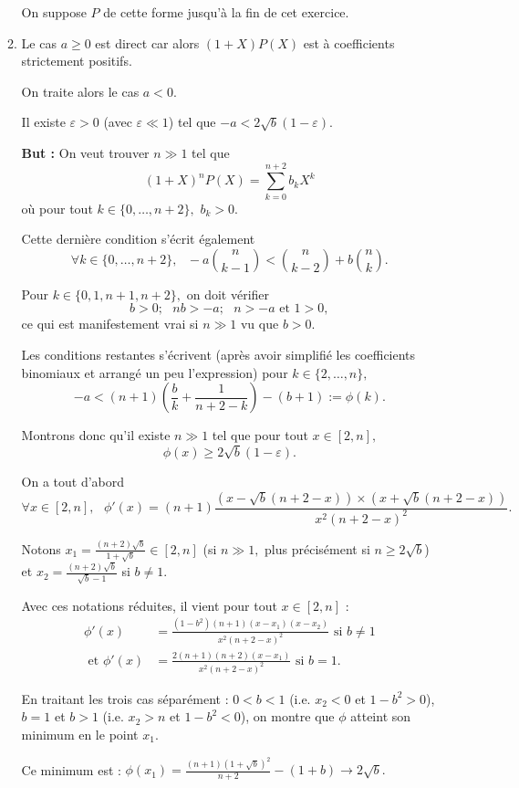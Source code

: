 \begin{enumerate}
\begin{enumerate}
On suppose $P$ de cette forme jusqu'à la fin de cet exercice.

\item Le cas $a\geq 0$ est direct car alors $(1+X)P(X)$ est à coefficients strictement positifs.

On traite alors le cas $a<0.$

Il existe $\varepsilon>0$ (avec $\varepsilon\ll 1$) tel que $-a<2\sqrt{b}(1-\varepsilon).$

\textbf{But :} On veut trouver $n\gg 1$ tel que $$(1+X)^{n}P(X)=\sum_{k=0}^{n+2}b_{k}X^{k}$$ où pour tout  $k\in\{0,\ldots,n+2\},$ $b_{k}>0.$

Cette dernière condition s'écrit également $$ \forall k\in \{0,\ldots,n+2\},\mbox{  } -a\binom{n}{k-1}<\binom{n}{k-2}+b\binom{n}{k}.$$

Pour $k\in\{0,1,n+1,n+2\},$ on doit vérifier $$b>0;\mbox{ }nb>-a;\mbox{ }n>-a \mbox{ et } 1>0,$$ ce qui est manifestement vrai si $n\gg 1$ vu que $b>0.$

Les conditions restantes s'écrivent (après avoir simplifié les coefficients binomiaux et arrangé un peu l'expression) pour $k\in\{2,\ldots,n\},$ $$ -a<(n+1)\left( \frac{b}{k}+\frac{1}{n+2-k}\right)-(b+1):=\phi(k).$$

Montrons donc qu'il existe $n\gg1$ tel que pour tout $x\in[2,n],$ $$\phi(x)\geq 2\sqrt{b}(1-\varepsilon).$$

On a  tout d'abord $$\forall x\in[2,n],\mbox{ } \phi'(x)=(n+1)\frac{\left( x-\sqrt{b}(n+2-x)\right)\times \left( x+\sqrt{b}(n+2-x)\right) } {x^{2}(n+2-x)^{2}}.$$

 Notons $\displaystyle x_{1}=\frac{(n+2)\sqrt{b}}{1+\sqrt{b}}\in[2,n]$ (si $n\gg1,$ plus précisément si $n\geq 2\sqrt{b}$) et  $\displaystyle x_{2}=\frac{(n+2)\sqrt{b}}{\sqrt{b}-1}$ si $b\neq 1.$

Avec ces notations réduites, il vient pour tout $x\in[2,n]$ : \begin{align*}
\phi'(x) & =\frac{(1-b^{2})(n+1)(x-x_{1})(x-x_{2})}{x^{2}(n+2-x)^{2}} \mbox{ si } b\neq 1\\
\mbox{ et } \phi'(x) & =\frac{2(n+1)(n+2)(x-x_{1})}{x^{2}(n+2-x)^{2}} \mbox{ si } b=1.    
\end{align*}

En traitant les trois cas séparément : $\boxed{0<b<1}$ (i.e. $x_{2}<0$ et $1-b^{2}>0$), $\boxed{ b=1} $ et $\boxed{b> 1}$ (i.e. $x_{2}>n$ et $1-b^{2}<0$), on montre que $\phi$ atteint son minimum en le point $x_{1}.$ 

Ce minimum est : $\displaystyle \phi(x_{1})=\frac{(n+1)(1+\sqrt{b})^{2}}{n+2}-(1+b)\longrightarrow 2\sqrt{b}.$


\end{enumerate}
\end{enumerate}
